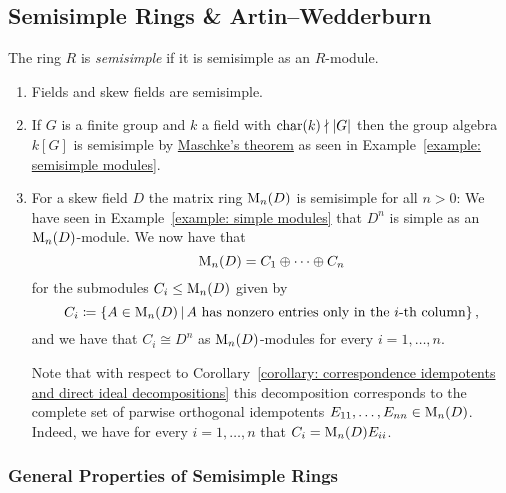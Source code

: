 \subsection{Semisimple Rings \& Artin--Wedderburn}


\begin{definition}
  The ring $R$ is \emph{semisimple} if it is semisimple as an $R$-module.
\end{definition}


\begin{example}
  \label{example: semisimple rings}
  \leavevmode
  \begin{enumerate}
    \item
      Fields and skew fields are semisimple.
    \item
      If $G$ is a finite group and $k$ a field with $\operatorname{char}(k) \nmid |G|$ then the group algebra $k[G]$ is semisimple by \hyperref[theorem: maschkes theorem]{Maschke’s theorem} as seen in Example~\ref{example: semisimple modules}.
    \item
      For a skew field $D$ the matrix ring $\operatorname{M}_n(D)$ is semisimple for all $n > 0$:
      We have seen in Example~\ref{example: simple modules} that $D^n$ is simple as an $\operatorname{M}_n(D)$-module.
      We now have that
      \[
          \operatorname{M}_n(D)
        = C_1 \oplus \dotsb \oplus C_n
      \]
      for the submodules $C_i \leq \operatorname{M}_n(D)$ given by 
      \[
                  C_i
        \defined  \{
                    A \in \Mat_n(D)
                  \suchthat
                    \text{$A$ has nonzero entries only in the $i$-th column}
                  \} \,,
      \]
      and we have that $C_i \cong D^n$ as $\operatorname{M}_n(D)$-modules for every $i = 1, \dotsc, n$.
      
      Note that with respect to Corollary~\ref{corollary: correspondence idempotents and direct ideal decompositions} this decomposition corresponds to the complete set of parwise orthogonal idempotents $E_{11}, \dotsc, E_{nn} \in \operatorname{M}_n(D)$.
      Indeed, we have for every $i = 1, \dotsc, n$ that $C_i = \operatorname{M}_n(D) E_{ii}$.
  \end{enumerate}
\end{example}




\subsubsection{General Properties of Semisimple Rings}


